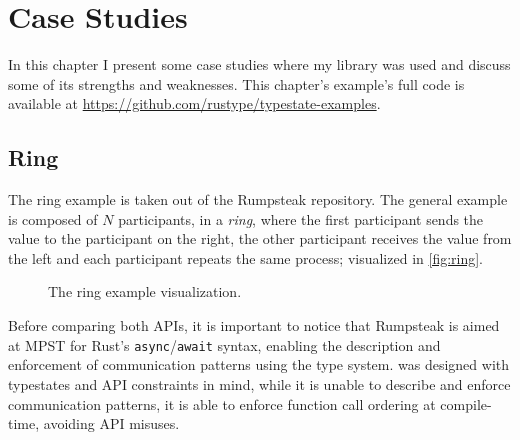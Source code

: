 

\chapter{Case Studies}\label{cha:case-study}

In this chapter I present some case studies where my library was used and discuss some of its strengths and weaknesses.
This chapter's example's full code is available at \url{https://github.com/rustype/typestate-examples}.

\section{Ring}\label{sec:case-study:ring}

The ring example is taken out of the Rumpsteak \autocite{Cutner2021} repository.
The general example is composed of $N$ participants, in a \emph{ring},
where the first participant sends the value to the participant on the right,
the other participant receives the value from the left and each participant repeats the same process;
visualized in \autoref{fig:ring}.

\begin{figure}
    \centering
    \caption{The ring example visualization.}
    \label{fig:ring}
\end{figure}

Before comparing both APIs, it is important to notice that Rumpsteak is aimed at \gls{MPST}
for Rust's \texttt{async}/\texttt{await} syntax,
enabling the description and enforcement of communication patterns using the type system.
 was designed with typestates and API constraints in mind,
while it is unable to describe and enforce communication patterns,
it is able to enforce function call ordering at compile-time, avoiding API misuses.

